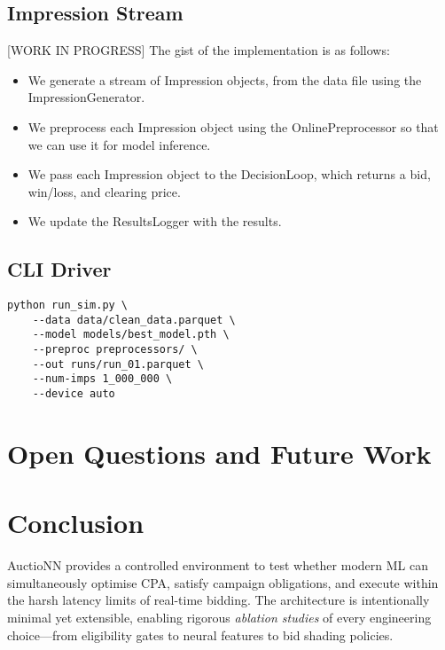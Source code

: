 \documentclass[11pt]{article}
\begin{document}
\subsection{Impression Stream}
[WORK IN PROGRESS]
The gist of the implementation is as follows:
\begin{itemize}
  \item We generate a stream of Impression objects, from the data file using the ImpressionGenerator.
  \item We preprocess each Impression object using the OnlinePreprocessor so that we can use it for model inference.
  \item We pass each Impression object to the DecisionLoop, which returns a bid, win/loss, and clearing price.
  \item We update the ResultsLogger with the results.
\end{itemize}

\subsection{CLI Driver}

\begin{verbatim}
python run_sim.py \
    --data data/clean_data.parquet \
    --model models/best_model.pth \
    --preproc preprocessors/ \
    --out runs/run_01.parquet \
    --num-imps 1_000_000 \
    --device auto
\end{verbatim}


\section{Open Questions and Future Work}\label{sec:openq}

\section{Conclusion}
AuctioNN provides a controlled environment to test whether modern ML
can simultaneously optimise CPA, satisfy campaign obligations, and
execute within the harsh latency limits of real-time bidding.  The
architecture is intentionally minimal yet extensible, enabling
rigorous \emph{ablation studies} of every engineering choice—from
eligibility gates to neural features to bid shading policies.



\end{document}
